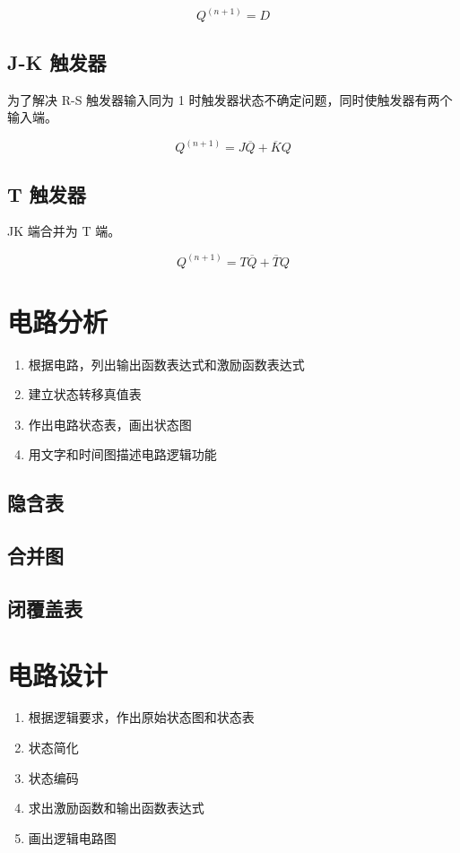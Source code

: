 \begin{equation}
    Q^{(n+1)}=D
\end{equation}

\subsection{J-K 触发器}

为了解决 R-S 触发器输入同为 1 时触发器状态不确定问题，同时使触发器有两个输入端。

\begin{equation}
    Q^{(n+1)}=J\overline{Q}+\overline{K}Q
\end{equation}

\subsection{T 触发器}

JK 端合并为 T 端。

\begin{equation}
    Q^{(n+1)}=T\overline{Q}+\overline{T}Q
\end{equation}

\newpage

\section{电路分析}

\begin{enumerate}
    \item 根据电路，列出输出函数表达式和激励函数表达式
    \item 建立状态转移真值表
    \item 作出电路状态表，画出状态图
    \item 用文字和时间图描述电路逻辑功能
\end{enumerate}

\subsection{隐含表}
\subsection{合并图}
\subsection{闭覆盖表}

\section{电路设计}

\begin{enumerate}
    \item 根据逻辑要求，作出原始状态图和状态表
    \item 状态简化
    \item 状态编码
    \item 求出激励函数和输出函数表达式
    \item 画出逻辑电路图
\end{enumerate}

\newpage

